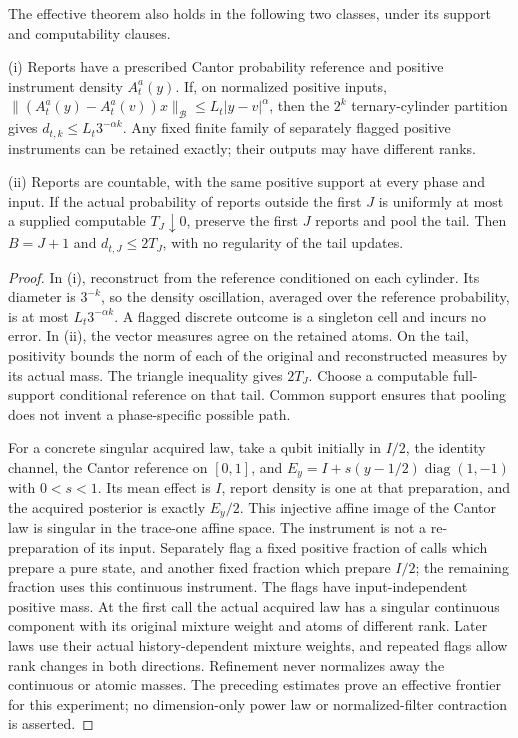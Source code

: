 \begin{proposition}\label{prop:effective_singular}
The effective theorem also holds in the following two classes, under its support and computability clauses.

\textup{(i)} Reports have a prescribed Cantor probability reference and positive instrument density $A_t^a(y)$. If, on normalized positive inputs,
$\|(A_t^a(y)-A_t^a(v))x\|_{\mathcal B}\le L_t|y-v|^\alpha$, then the $2^k$ ternary-cylinder partition gives $d_{t,k}\le L_t3^{-\alpha k}$. Any fixed finite family of separately flagged positive instruments can be retained exactly; their outputs may have different ranks.

\textup{(ii)} Reports are countable, with the same positive support at every phase and input. If the actual probability of reports outside the first $J$ is uniformly at most a supplied computable $T_J\downarrow0$, preserve the first $J$ reports and pool the tail. Then $B=J+1$ and $d_{t,J}\le2T_J$, with no regularity of the tail updates.
\end{proposition}
\begin{proof}
In (i), reconstruct from the reference conditioned on each cylinder. Its diameter is $3^{-k}$, so the density oscillation, averaged over the reference probability, is at most $L_t3^{-\alpha k}$. A flagged discrete outcome is a singleton cell and incurs no error. In (ii), the vector measures agree on the retained atoms. On the tail, positivity bounds the norm of each of the original and reconstructed measures by its actual mass. The triangle inequality gives $2T_J$. Choose a computable full-support conditional reference on that tail. Common support ensures that pooling does not invent a phase-specific possible path.

For a concrete singular acquired law, take a qubit initially in $I/2$, the identity channel, the Cantor reference on $[0,1]$, and $E_y=I+s(y-1/2)\operatorname{diag}(1,-1)$ with $0<s<1$. Its mean effect is $I$, report density is one at that preparation, and the acquired posterior is exactly $E_y/2$. This injective affine image of the Cantor law is singular in the trace-one affine space. The instrument is not a re-preparation of its input. Separately flag a fixed positive fraction of calls which prepare a pure state, and another fixed fraction which prepare $I/2$; the remaining fraction uses this continuous instrument. The flags have input-independent positive mass. At the first call the actual acquired law has a singular continuous component with its original mixture weight and atoms of different rank. Later laws use their actual history-dependent mixture weights, and repeated flags allow rank changes in both directions. Refinement never normalizes away the continuous or atomic masses. The preceding estimates prove an effective frontier for this experiment; no dimension-only power law or normalized-filter contraction is asserted.
\end{proof}
